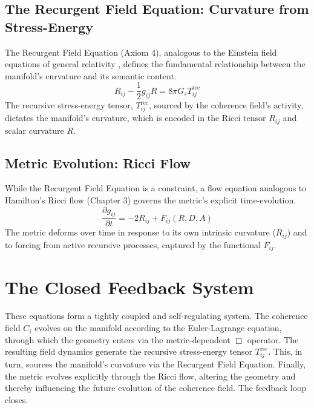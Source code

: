 \subsection{The Recurgent Field Equation: Curvature from Stress-Energy}

The Recurgent Field Equation (Axiom 4), analogous to the Einstein field equations of general relativity \autocite{Einstein1915}, defines the fundamental relationship between the manifold's curvature and its semantic content.
\begin{equation}
R_{ij} - \frac{1}{2}g_{ij}R = 8\pi G_s T^{\text{rec}}_{ij}
\end{equation}
The recursive stress-energy tensor, \(T^{\text{rec}}_{ij}\), sourced by the coherence field's activity, dictates the manifold's curvature, which is encoded in the Ricci tensor \(R_{ij}\) and scalar curvature \(R\).

\subsection{Metric Evolution: Ricci Flow}

While the Recurgent Field Equation is a constraint, a flow equation analogous to Hamilton's Ricci flow (Chapter 3) \autocite{Hamilton1982} governs the metric's explicit time-evolution.
\begin{equation}
\frac{\partial g_{ij}}{\partial t} = -2 R_{ij} + F_{ij}(R, D, A)
\end{equation}
The metric deforms over time in response to its own intrinsic curvature (\(R_{ij}\)) and to forcing from active recursive processes, captured by the functional \(F_{ij}\).

\section{The Closed Feedback System}

These equations form a tightly coupled and self-regulating system. The coherence field \(C_i\) evolves on the manifold according to the Euler-Lagrange equation, through which the geometry enters via the metric-dependent \(\Box\) operator. The resulting field dynamics generate the recursive stress-energy tensor \(T^{\text{rec}}_{ij}\). This, in turn, sources the manifold's curvature via the Recurgent Field Equation. Finally, the metric evolves explicitly through the Ricci flow, altering the geometry and thereby influencing the future evolution of the coherence field. The feedback loop closes.

